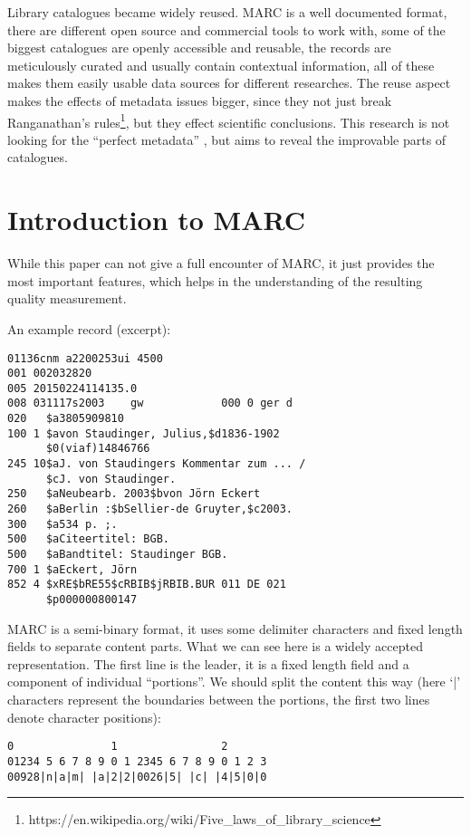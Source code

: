 Library catalogues became widely reused. MARC is a well documented format, there are different open source and commercial tools to work with, some of the biggest catalogues are openly accessible and reusable, the records are meticulously curated and usually contain contextual information, all of these makes them easily usable data sources for different researches. The reuse aspect makes the effects of metadata issues bigger, since they not just break Ranganathan's rules\footnote{https://en.wikipedia.org/wiki/Five\_laws\_of\_library\_science}, but they effect scientific conclusions. This research is not looking for the ``perfect metadata'' \cite{bade2008}, but aims to reveal the improvable parts of catalogues.

\section{Introduction to MARC}

While this paper can not give a full encounter of MARC, it just provides the most important features, which helps in the understanding of the resulting quality measurement. 

An example record (excerpt):

\begin{verbatim}
01136cnm a2200253ui 4500
001 002032820
005 20150224114135.0
008 031117s2003    gw            000 0 ger d
020   $a3805909810
100 1 $avon Staudinger, Julius,$d1836-1902
      $0(viaf)14846766
245 10$aJ. von Staudingers Kommentar zum ... /
      $cJ. von Staudinger.
250   $aNeubearb. 2003$bvon Jörn Eckert
260   $aBerlin :$bSellier-de Gruyter,$c2003.
300   $a534 p. ;.
500   $aCiteertitel: BGB.
500   $aBandtitel: Staudinger BGB.
700 1 $aEckert, Jörn
852 4 $xRE$bRE55$cRBIB$jRBIB.BUR 011 DE 021
      $p000000800147
\end{verbatim}

MARC is a semi-binary format, it uses some delimiter characters and fixed length fields to separate content parts. What we can see here is a widely accepted representation. 
The first line is the leader, it is a fixed length field and a component of individual ``portions''. We should split the content this way (here `|' characters represent the boundaries between the portions, the first two lines denote character positions):

\begin{verbatim}
0               1                2
01234 5 6 7 8 9 0 1 2345 6 7 8 9 0 1 2 3
00928|n|a|m| |a|2|2|0026|5| |c| |4|5|0|0
\end{verbatim}

